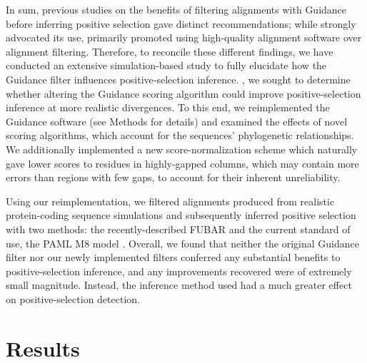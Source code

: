\documentclass[10pt]{article}
\begin{document}
In sum, previous studies on the benefits of filtering alignments with Guidance before inferring positive selection gave distinct recommendations; while \citet{Privman2012} strongly advocated its use, \citet{Jordan2012} primarily promoted using high-quality alignment software over alignment filtering. Therefore, to reconcile these different findings, we have conducted an extensive simulation-based study to fully elucidate how the Guidance filter influences positive-selection inference.
, we sought to determine whether altering the Guidance scoring algorithm could improve positive-selection inference at more realistic divergences. To this end, we reimplemented the Guidance software (see Methods for details) and examined the effects of novel scoring algorithms, which account for the sequences' phylogenetic relationships. We additionally implemented a new score-normalization scheme which naturally gave lower scores to residues in highly-gapped columns, which may contain more errors than regions with few gaps, to account for their inherent unreliability.

Using our reimplementation, we filtered alignments produced from realistic protein-coding sequence simulations and subsequently inferred positive selection with two methods: the recently-described FUBAR \citep{Murrell2013} and the current standard of use, the PAML M8 model \citep{Yang2007}. Overall, we found that neither the original Guidance filter nor our newly implemented filters conferred any substantial benefits to positive-selection inference, and any improvements recovered were of extremely small magnitude. Instead, the inference method used had a much greater effect on positive-selection detection.


\section*{Results}
\end{document}
